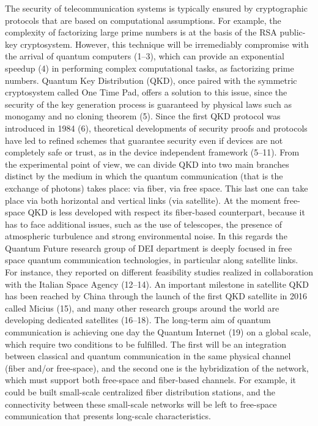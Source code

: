 The security of telecommunication systems is typically ensured by cryptographic protocols that are based on computational assumptions. For example, the complexity of factorizing large prime numbers is at the basis of the RSA public-key cryptosystem. However, this technique will be irremediably compromise with the arrival of quantum computers (1–3), which can provide an exponential speedup (4) in performing complex computational tasks, as factorizing prime numbers. Quantum Key Distribution (QKD), once paired with the symmetric cryptosystem called One Time Pad, offers a solution to this issue, since the security of the key generation process is guaranteed by physical laws such as monogamy and no cloning theorem (5).
Since the first QKD protocol was introduced in 1984 (6), theoretical developments of security proofs and protocols have led to refined schemes that guarantee security even if devices are not completely safe or trust, as in the device independent framework (5–11).
From the experimental point of view, we can divide QKD into two main branches distinct by the medium in which the quantum communication (that is the exchange of photons) takes place: via fiber, via free space. This last one can take place via both horizontal and vertical links (via satellite). At the moment free-space QKD is less developed with respect its fiber-based counterpart, because it has to face additional issues, such as the use of telescopes, the presence of atmospheric turbulence and strong environmental noise. In this regards the Quantum Future research group of DEI department is deeply focused in free space quantum communication technologies, in particular along satellite links. For instance, they reported on different feasibility studies realized in collaboration with the Italian Space Agency (12–14). An important milestone in satellite QKD has been reached by China through the launch of the first QKD satellite in 2016 called Micius (15), and many other research groups around the world are developing dedicated satellites (16–18). The long-term aim of quantum communication is achieving one day the Quantum Internet (19) on a global scale, which require two conditions to be fulfilled. The first will be an integration between classical and quantum communication in the same physical channel (fiber and/or free-space), and the second one is the hybridization of the network, which must support both free-space and fiber-based channels. For example, it could be built small-scale centralized fiber distribution stations, and the connectivity between these small-scale networks will be left to free-space communication that presents long-scale characteristics.


